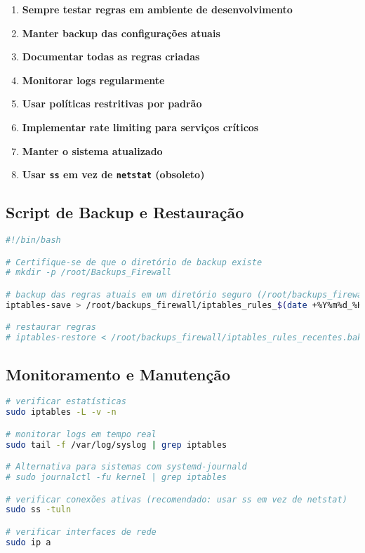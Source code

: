﻿\documentclass[12pt,fleqn]{article}
\begin{document}
\begin{enumerate}
    \item \textbf{Sempre testar regras em ambiente de desenvolvimento}
    \item \textbf{Manter backup das configurações atuais}
    \item \textbf{Documentar todas as regras criadas}
    \item \textbf{Monitorar logs regularmente}
    \item \textbf{Usar políticas restritivas por padrão}
    \item \textbf{Implementar rate limiting para serviços críticos}
    \item \textbf{Manter o sistema atualizado}
    \item \textbf{Usar \texttt{ss} em vez de \texttt{netstat} (obsoleto)}
\end{enumerate}

\subsection{Script de Backup e Restauração}

\begin{lstlisting}[language=bash, caption=Script de backup]
#!/bin/bash

# Certifique-se de que o diretório de backup existe
# mkdir -p /root/Backups_Firewall

# backup das regras atuais em um diretório seguro (/root/backups_firewall)
iptables-save > /root/backups_firewall/iptables_rules_$(date +%Y%m%d_%H%M%S).bak

# restaurar regras
# iptables-restore < /root/backups_firewall/iptables_rules_recentes.bak
\end{lstlisting}

\subsection{Monitoramento e Manutenção}

\begin{lstlisting}[language=bash, caption=Comandos de monitoramento]
# verificar estatísticas
sudo iptables -L -v -n

# monitorar logs em tempo real
sudo tail -f /var/log/syslog | grep iptables

# Alternativa para sistemas com systemd-journald
# sudo journalctl -fu kernel | grep iptables

# verificar conexões ativas (recomendado: usar ss em vez de netstat)
sudo ss -tuln

# verificar interfaces de rede
sudo ip a
\end{lstlisting}
\end{document}
